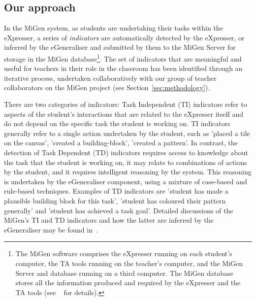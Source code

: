 \subsection{Our approach}
\label{sec:our-approach}
 
In the MiGen system, as students are undertaking their tasks within the eXpresser, a series
of {\em indicators} are automatically detected by the eXpresser, or
inferred by the eGeneraliser and submitted by them to the MiGen
Server for storage in the MiGen database\footnote{The MiGen software
  comprises the eXpresser running on each student’s computer, the TA
  tools running on the teacher’s computer, and the MiGen Server and
  database running on a third computer. The MiGen database stores all
  the information produced and required by the eXpresser and the TA
  tools (see ~\cite{MiGen-CAE,IEEE-TLT-TA} for details).}.   
The set of indicators that are meaningful and useful for teachers in
their role in the classroom has been identified through an iterative
process, undertaken collaboratively with our group of teacher
collaborators on the MiGen project (see Section~\ref{sec:methodology}).  

There are two categories of indicators: Task Independent (TI)
indicators refer to aspects of the student's interactions that are
related to the eXpresser itself and do not depend on the specific task
the student is working on. TI indicators generally refer to a single
action undertaken by the student, such as 'placed a tile on the
canvas', 'created a building-block', 'created a pattern'. In contrast,
the detection of Task Dependent (TD) indicators requires access to
knowledge about the task that the student is working on, it may relate
to combinations of actions by the student, and it requires intelligent
reasoning by the system. This reasoning is undertaken by the
eGeneraliser component, using a mixture of case-based and rule-based
techniques. Examples of TD indicators are 'student has made a
plausible building block for this task', 'student has coloured their
pattern generally' and 'student has achieved a task goal'. Detailed
discussions of the MiGen's TI and TD indicators and how the latter are
inferred by the eGeneraliser may be found in~\cite{IEEE-TLT-TA}.
 
